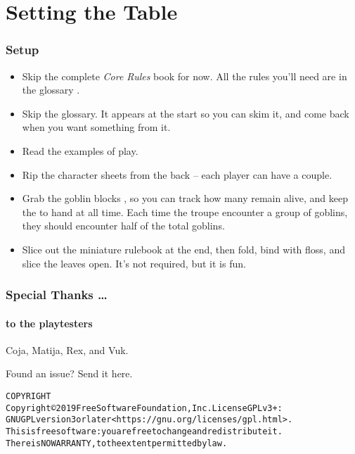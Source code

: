 \chapter{Setting the Table}

\begin{multicols}{2}
\subsection*{Setup}

\begin{itemize}
  \item
  Skip the complete \textit{Core Rules} book for now.
  All the rules you'll need are in the glossary .
  \item
  Skip the glossary.
  It appears at the start so you can skim it, and come back when you want something from it.
  \item
  Read the examples of play.
  \item
  Rip the character sheets from the back -- each player can have a couple.
  \item
  Grab the goblin blocks , so you can track how many remain alive, and keep the  to hand at all time.
  Each time the troupe encounter a group of goblins, they should encounter half of the total goblins.
  \item
  Slice out the miniature rulebook at the end, then fold, bind with floss, and slice the leaves open.
  It's not required, but it is fun.
\end{itemize}

\columnbreak

\subsection*{Special Thanks \ldots}
\subsubsection*{to the playtesters}
Coja, Matija, Rex, and Vuk.

\begin{center}
  
  Found an issue?
  Send it here.
\end{center}

\end{multicols}

\begin{alltt}
COPYRIGHT
       Copyright \copyright 2019 Free Software Foundation, Inc.  License GPLv3+:
  GNU GPL version 3 or later <https://gnu.org/licenses/gpl.html>.
       This is free software: you are free to change and redistribute it.
  There is NO WARRANTY, to the extent permitted by law.

\end{alltt}

\printbibliography[heading=subbibliography]

